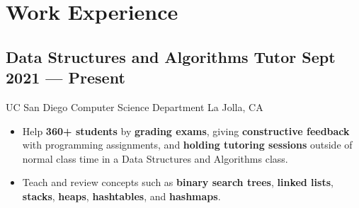\documentclass[a4,10pt]{article}
\newcommand{\subtext}[1]{
#1\par\vspace{-0.2cm}}
\newenvironment{zitemize}{
\begin{itemize}\itemsep0pt \parskip0pt \parsep1pt}
{\end{itemize}\vspace{-0.5cm}}
\begin{document}
\section{Work Experience}

        

\subsection*{Data Structures and Algorithms Tutor \hfill Sept 2021 --- Present} 
\subtext{UC San Diego Computer Science Department \hfill La Jolla, CA} 
    \begin{zitemize}
        \item Help \textbf{360+ students} by \textbf{grading exams}, giving \textbf{constructive feedback} with programming assignments, and \textbf{holding tutoring sessions} outside of normal class time in a Data Structures and Algorithms class.
        \item Teach and review concepts such as \textbf{binary search trees}, \textbf{linked lists}, \textbf{stacks}, \textbf{heaps}, \textbf{hashtables}, and \textbf{hashmaps}.
    \end{zitemize}


\end{document}
